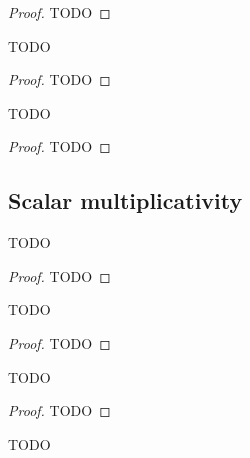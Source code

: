 \begin{proof}
    \leanok
    TODO
\end{proof}

\begin{lemma}
    \label{lemma:asymp_ge_add_pos}
    \leanok
    TODO
\end{lemma}

\begin{proof}
    \leanok
    TODO
\end{proof}

\begin{lemma}
    \label{lemma:asymp_le_add_neg}
    \leanok
    TODO
\end{lemma}

\begin{proof}
    \leanok
    TODO
\end{proof}


\subsection{Scalar multiplicativity}

\begin{theorem}
    \label{thm:asymp_le_pos_mul}
    \leanok
    TODO
\end{theorem}

\begin{proof}
    \leanok
    TODO
\end{proof}

\begin{theorem}
    \label{thm:asymp_ge_pos_mul}
    \leanok
    TODO
\end{theorem}

\begin{proof}
    \leanok
    TODO
\end{proof}

\begin{theorem}
    \label{thm:asymp_le_neg_mul}
    \leanok
    TODO
\end{theorem}

\begin{proof}
    \leanok
    TODO
\end{proof}

\begin{theorem}
    \label{thm:asymp_ge_neg_mul}
    \leanok
    TODO
\end{theorem}

